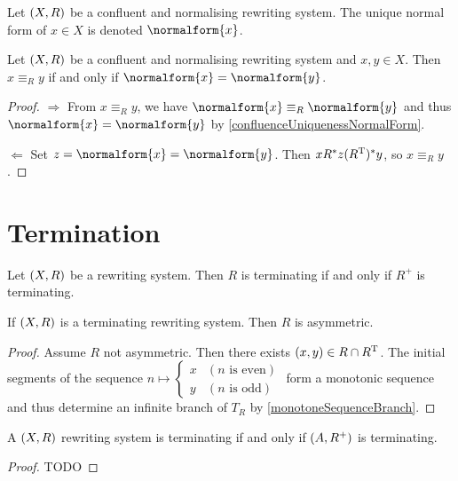 \begin{definition}
Let $\sSet{X,R}$ be a confluent and normalising rewriting system. The unique normal form of $x\in X$ is denoted $\normalform{x}$.
\end{definition}

\begin{proposition}
Let $\sSet{X,R}$ be a confluent and normalising rewriting system and $x,y\in X$. Then $x \equiv_R y$ \textup{if and only if} $\normalform{x} = \normalform{y}$.
\end{proposition}
\begin{proof}
$\boxed{\Rightarrow}$ From $x \equiv_R y$, we have $\normalform{x} \equiv_R \normalform{y}$ and thus $\normalform{x} = \normalform{y}$ by \ref{confluenceUniquenessNormalForm}.

$\boxed{\Leftarrow}$ Set $z = \normalform{x} = \normalform{y}$. Then $x R^* z (R^{\mathrm{T}})^* y$, so $x \equiv_R y$.
\end{proof}

\section{Termination}

\begin{lemma}
Let $\sSet{X,R}$ be a rewriting system. Then $R$ is terminating \textup{if and only if} $R^+$ is terminating.
\end{lemma}

\begin{lemma}
If $\sSet{X, R}$ is a terminating rewriting system. Then $R$ is asymmetric.
\end{lemma}
\begin{proof}
Assume $R$ not asymmetric. Then there exists $(x,y)\in R\cap R^{\mathrm{T}}$. The initial segments of the sequence $n\mapsto \begin{cases}
x & (\text{$n$ is even}) \\
y & (\text{$n$ is odd})
\end{cases}$ form a monotonic sequence and thus determine an infinite branch of $T_R$ by \ref{monotoneSequenceBranch}.
\end{proof}

\begin{proposition}
A $\sSet{X,R}$ rewriting system is terminating \textup{if and only if} $\sSet{A,R^+}$ is terminating.
\end{proposition}
\begin{proof}
TODO
\end{proof}

